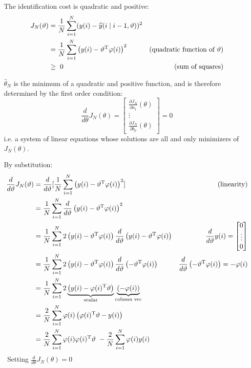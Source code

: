 The identification cost is quadratic and positive:		
\begin{align*}
J_{N}(\vartheta) & =\frac{1}{N}\sum _{i=1}^{N}(y(i) -\widehat{y}(i\mid i-1,\vartheta))^{2} & \\
 & =\frac{1}{N}\sum _{i=1}^{N}\left(y(i) -\vartheta ^{\mathrm{T}} \varphi (i)\right)^{2} & (\text{quadratic function of} \ \vartheta) \\
 & \geq \ 0 & \text{(sum of squares)}
\end{align*}


$ \hat{\theta }_{N}$ is the minimum of a quadratic and positive function, and is therefore determined by the first order condition:
\begin{equation*}
\frac{d}{d\theta } J_{N}(\theta) =\begin{bmatrix}
\frac{\partial J_{N}}{\partial a_{1}}(\theta)\\
\vdots \\
\frac{\partial J_{N}}{\partial b_{p}}(\theta)
\end{bmatrix} =0
\end{equation*}
i.e. a system of linear equations whose solutions are all and only minimizers of $ J_{N}(\theta)$.

By substitution:
\begin{align*}
\frac{d}{d\vartheta } J_{N}(\vartheta) & =\frac{d}{d\vartheta }[\frac{1}{N}\sum _{i=1}^{N}\left(y(i) -\vartheta ^{\mathrm{T}} \varphi (i)\right)^{2}] & \text{(linearity)}\\
 & =\frac{1}{N}\sum _{i=1}^{N}\frac{d}{d\vartheta }\left(y(i) -\vartheta ^{\mathrm{T}} \varphi (i)\right)^{2} & \\
 & =\frac{1}{N}\sum _{i=1}^{N} 2\left(y(i) -\vartheta ^{\mathrm{T}} \varphi (i)\right)\frac{d}{d\vartheta }\left(y(i) -\vartheta ^{\mathrm{T}} \varphi (i)\right) & \frac{d}{d\vartheta } y(i) =\begin{bmatrix}
0\\
\vdots \\
0
\end{bmatrix}\\
 & =\frac{1}{N}\sum _{i=1}^{N} 2\left(y(i) -\vartheta ^{\mathrm{T}} \varphi (i)\right)\frac{d}{d\vartheta }\left(-\vartheta ^{\mathrm{T}} \varphi (i)\right) & \frac{d}{d\vartheta }\left(-\vartheta ^{\mathrm{T}} \varphi (i)\right) =-\varphi (i)\\
 & =\frac{1}{N}\sum _{i=1}^{N} 2\underbrace{\left(y(i) -\varphi (i)^{\mathrm{T}} \vartheta \right)}_{\text{scalar}}\underbrace{(-\varphi (i))}_{\text{column vec}} & \\
 & =\frac{2}{N}\sum _{i=1}^{N} \varphi (i)\left(\varphi (i)^{\mathrm{T}} \vartheta -y(i)\right) & \\
 & =\frac{2}{N}\sum _{i=1}^{N} \varphi (i) \varphi (i)^{\mathrm{T}} \vartheta \ -\frac{2}{N}\sum _{i=1}^{N} \varphi (i) y(i) & 
\end{align*} \ 
Setting $ \frac{d}{d\theta } J_{N}(\theta) =0$	


